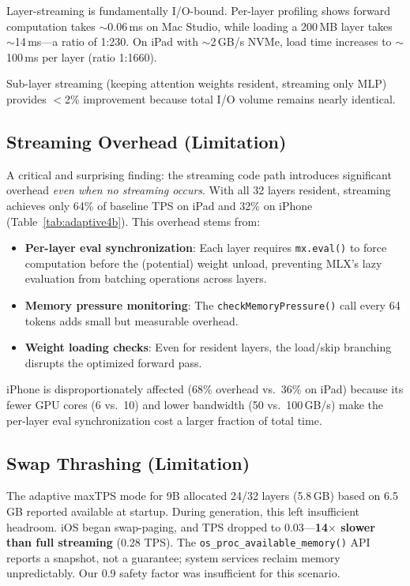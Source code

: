 \documentclass[10pt,a4paper]{article}
\begin{document}
Layer-streaming is fundamentally I/O-bound. Per-layer profiling shows forward computation takes $\sim$0.06\,ms on Mac Studio, while loading a 200\,MB layer takes $\sim$14\,ms---a ratio of 1:230. On iPad with $\sim$2\,GB/s NVMe, load time increases to $\sim$100\,ms per layer (ratio 1:1660).

Sub-layer streaming (keeping attention weights resident, streaming only MLP) provides $<$2\% improvement because total I/O volume remains nearly identical.

\subsection{Streaming Overhead (Limitation)}

A critical and surprising finding: the streaming code path introduces significant overhead \emph{even when no streaming occurs}. With all 32 layers resident, streaming achieves only 64\% of baseline TPS on iPad and 32\% on iPhone (Table~\ref{tab:adaptive4b}). This overhead stems from:
\begin{itemize}
    \item \textbf{Per-layer eval synchronization}: Each layer requires \texttt{mx.eval()} to force computation before the (potential) weight unload, preventing MLX's lazy evaluation from batching operations across layers.
    \item \textbf{Memory pressure monitoring}: The \texttt{checkMemoryPressure()} call every 64 tokens adds small but measurable overhead.
    \item \textbf{Weight loading checks}: Even for resident layers, the load/skip branching disrupts the optimized forward pass.
\end{itemize}

iPhone is disproportionately affected (68\% overhead vs.\ 36\% on iPad) because its fewer GPU cores (6 vs.\ 10) and lower bandwidth (50 vs.\ 100\,GB/s) make the per-layer eval synchronization cost a larger fraction of total time.

\subsection{Swap Thrashing (Limitation)}

The adaptive maxTPS mode for 9B allocated 24/32 layers (5.8\,GB) based on 6.5\,GB reported available at startup. During generation, this left insufficient headroom. iOS began swap-paging, and TPS dropped to 0.03---\textbf{14$\times$ slower than full streaming} (0.28 TPS). The \texttt{os\_proc\_available\_memory()} API reports a snapshot, not a guarantee; system services reclaim memory unpredictably. Our 0.9 safety factor was insufficient for this scenario.
\end{document}

